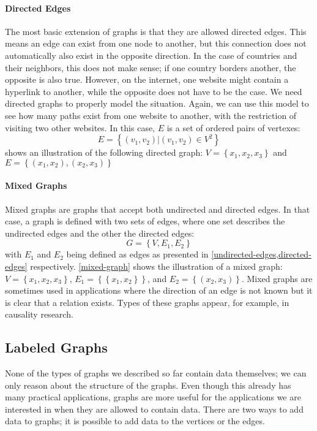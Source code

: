 \paragraph{Directed Edges} The most basic extension of graphs is that they are allowed directed edges. This means an edge can exist from one node to another, but this connection does not  automatically also exist in the opposite direction. In the case of countries and their neighbors, this does not make sense; if one country borders another, the opposite is also true. However, on the internet, one website might contain a hyperlink to another, while the opposite does not have to be the case. We need directed graphs to properly model the situation. Again, we can use this model to see how many paths exist from one website to another, with the restriction of visiting two other websites. In this case, $E$ is a set of ordered pairs of vertexes: 
\begin{equation}
	E = \left\{\left(v_1, v_2\right) | \left(v_1, v_2\right) \in V^2\right\}
	\label{directed-edges}
\end{equation}
 shows an illustration of the following directed graph:
$V = \left\{x_1, x_2, x_3\right\}$ and $E = \left\{\left(x_1, x_2\right), \left(x_2, x_3\right)\right\}$

\paragraph{Mixed Graphs}
Mixed graphs are graphs that accept both undirected and directed edges. In that case, a graph is defined with two sets of edges, where one set describes the undirected edges and the other the directed edges:
\begin{equation}
	G = \left\{V, E_1, E_2\right\}
\end{equation}
with $E_1$ and $E_2$ being defined as edges as presented in \cref{undirected-edges,directed-edges} respectively. \cref{mixed-graph} shows the illustration of a mixed graph:
$V = \left\{x_1, x_2, x_3\right\}$, $E_1 = \left\{\left\{x_1, x_2\right\}\right\}$, and $E_2 = \left\{\left(x_2, x_3\right)\right\}$.
Mixed graphs are sometimes used in applications where the direction of an edge is not known but it is clear that a relation exists. Types of these graphs appear, for example, in causality research. 

\subsection{Labeled Graphs} 
None of the types of graphs we described so far contain data themselves; we can only reason about the structure of the graphs. Even though this already has many practical applications, graphs are more useful for the applications we are interested in when they are allowed to contain data. There are two ways to add data to graphs; it is possible to add data to the vertices or the edges.

